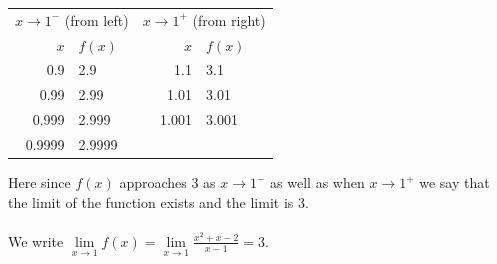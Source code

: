 \documentclass[11pt,a4paper]{article}
\theoremstyle{definition}
\begin{document}
\begin{table}[H]
\centering
\begin{tabular}{rl@{\qquad\qquad}rl}
\multicolumn{2}{c}{$x\longrightarrow 1^{-}$ (from left)} &
\multicolumn{2}{c}{$x\longrightarrow 1^{+}$ (from right)}\\
$x$ & $f(x)$ & $x$ & $f(x)$\\
0.9 & 2.9 & 1.1 & 3.1\\
0.99 & 2.99 & 1.01 & 3.01\\
0.999 & 2.999 & 1.001 & 3.001\\
0.9999 & 2.9999 & & \\
\end{tabular}
\end{table}

Here since $f(x)$ approaches 3 as $x\longrightarrow 1^{-}$ as well as when $x\longrightarrow 1^+$ we say that the limit of the function exists and the limit is 3.\\\\
We write $\lim\limits_{x\longrightarrow 1}f(x)=\lim\limits_{x\longrightarrow 1} \frac{x^2+x-2}{x-1}=3$.\\\\\\
\end{document}

